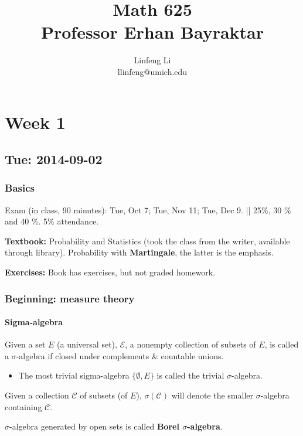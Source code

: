 \documentclass[11pt]{article}
\title{Math 625\\
Professor Erhan Bayraktar}
\author{Linfeng Li \\ llinfeng@umich.edu}
\begin{document}
\maketitle
\section{Week 1}
\subsection{Tue: 2014-09-02}
\subsubsection{Basics}
Exam (in class, 90 minutes): Tue, Oct 7; Tue, Nov 11; Tue, Dec 9.   || 25\%, 30
\% and 40 \%.  
5\% attendance. 


\textbf{Textbook: } Probability and Statistics (took the class from the writer,
available through library).  
Probability with \textbf{Martingale}, the latter is the emphasis.

\textbf{Exercises:} Book has exercises, but not graded homework.

\subsubsection{Beginning: measure theory}
\paragraph{Sigma-algebra}
Given a set $E$ (a universal set), $\mathcal E$, a nonempty collection of
subsets of $E$, is called a $\sigma$-algebra if closed under complements \&
countable unions. 

\begin{itemize}
  \item The most trivial sigma-algebra  $\{\emptyset, E\}$ is called the trivial
$\sigma$-algebra. 
\end{itemize}

\begin{definition}
  Given a collection $\mathcal C$ of subsets (of $E$), $\sigma(\mathcal C)$ will
  denote the smaller $\sigma$-algebra containing $\mathcal C$. 
\end{definition}

\begin{definition}
  $\sigma$-algebra generated by open sets  is called \textbf{Borel
  $\sigma$-algebra}.
\end{definition}
\end{document}
